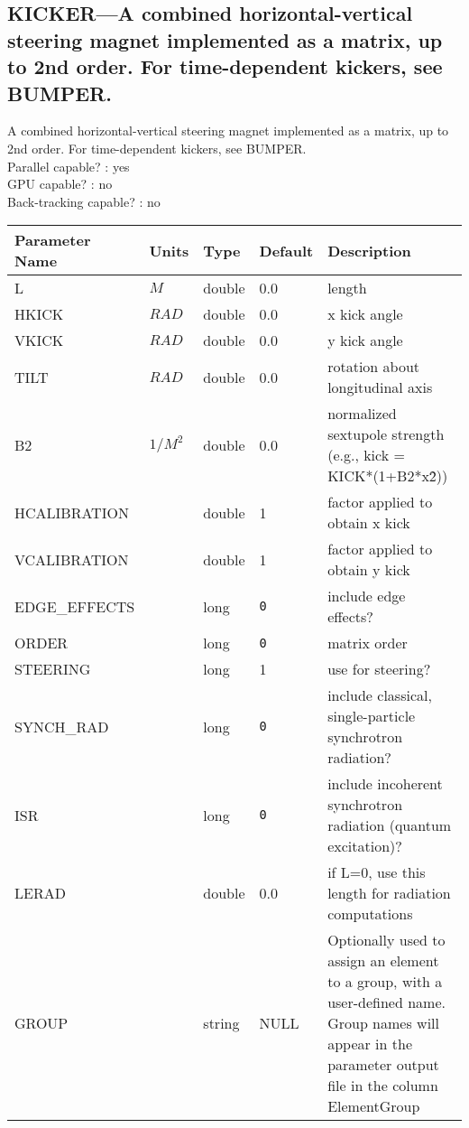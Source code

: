 \subsection{KICKER---A combined horizontal-vertical steering magnet implemented as a matrix, up to 2nd order. For time-dependent kickers, see BUMPER.}
A combined horizontal-vertical steering magnet implemented as a matrix, up to 2nd order. For time-dependent kickers, see BUMPER.
\\
Parallel capable? : yes\\
GPU capable? : no\\
Back-tracking capable? : no\\
\begin{tabular}{|l|l|l|l|p{\descwidth}|} \hline
Parameter Name & Units & Type & Default & Description \\ \hline 
L & $M$ & double &  0.0 & length  \\ \hline 
HKICK & $RAD$ & double &  0.0 & x kick angle  \\ \hline 
VKICK & $RAD$ & double &  0.0 & y kick angle  \\ \hline 
TILT & $RAD$ & double &  0.0 & rotation about longitudinal axis  \\ \hline 
B2 & $1/M^{2}$ & double &  0.0 & normalized sextupole strength (e.g., kick = KICK*(1+B2*x\^2))  \\ \hline 
HCALIBRATION &  & double &   1 & factor applied to obtain x kick  \\ \hline 
VCALIBRATION &  & double &   1 & factor applied to obtain y kick  \\ \hline 
EDGE\_EFFECTS &  & long &  \verb|0| & include edge effects?  \\ \hline 
ORDER &  & long &  \verb|0| & matrix order  \\ \hline 
STEERING &  & long &   1               & use for steering?  \\ \hline 
SYNCH\_RAD &  & long &  \verb|0| & include classical, single-particle synchrotron radiation?  \\ \hline 
ISR &  & long &  \verb|0| & include incoherent synchrotron radiation (quantum excitation)?  \\ \hline 
LERAD &  & double &  0.0 & if L=0, use this length for radiation computations  \\ \hline 
GROUP &  & string & NULL & Optionally used to assign an element to a group, with a user-defined name.  Group names will appear in the parameter output file in the column ElementGroup  \\ \hline 
\end{tabular}

